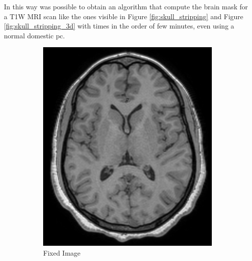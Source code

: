 \documentclass{standalone}
\begin{document}
In this way was possible to obtain an algorithm that compute the brain mask for a T1W MRI scan like the ones visible in Figure \ref{fig:skull_stripping} and Figure \ref{fig:skull_stripping_3d} with times in the order of few minutes, even using a normal domestic pc.


\begin{figure}[h!]
		\centering
        \begin{subfigure}[b]{0.325\textwidth}
             \includegraphics[scale=0.1]{img/Chap2/T1.jpg}
             \caption{Fixed Image}
             \label{fig:T1_atlas}
        \end{subfigure}
        \hfill
        \begin{subfigure}[b]{0.325\textwidth}

\end{subfigure}
\end{figure}
\end{document}

